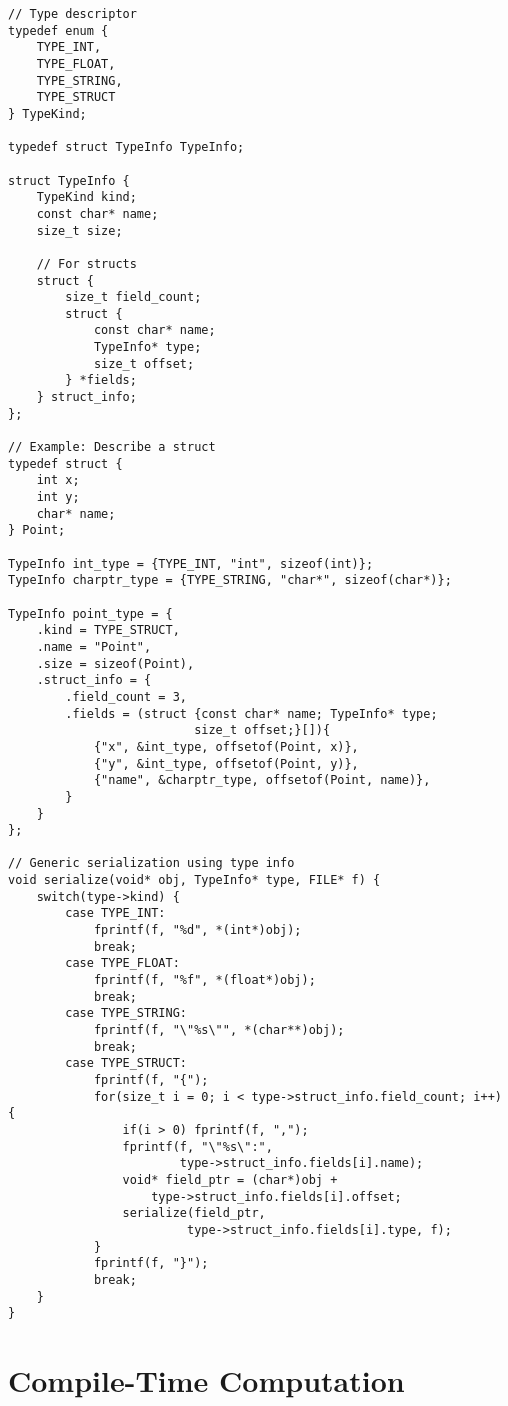 \begin{lstlisting}
// Type descriptor
typedef enum {
    TYPE_INT,
    TYPE_FLOAT,
    TYPE_STRING,
    TYPE_STRUCT
} TypeKind;

typedef struct TypeInfo TypeInfo;

struct TypeInfo {
    TypeKind kind;
    const char* name;
    size_t size;

    // For structs
    struct {
        size_t field_count;
        struct {
            const char* name;
            TypeInfo* type;
            size_t offset;
        } *fields;
    } struct_info;
};

// Example: Describe a struct
typedef struct {
    int x;
    int y;
    char* name;
} Point;

TypeInfo int_type = {TYPE_INT, "int", sizeof(int)};
TypeInfo charptr_type = {TYPE_STRING, "char*", sizeof(char*)};

TypeInfo point_type = {
    .kind = TYPE_STRUCT,
    .name = "Point",
    .size = sizeof(Point),
    .struct_info = {
        .field_count = 3,
        .fields = (struct {const char* name; TypeInfo* type;
                          size_t offset;}[]){
            {"x", &int_type, offsetof(Point, x)},
            {"y", &int_type, offsetof(Point, y)},
            {"name", &charptr_type, offsetof(Point, name)},
        }
    }
};

// Generic serialization using type info
void serialize(void* obj, TypeInfo* type, FILE* f) {
    switch(type->kind) {
        case TYPE_INT:
            fprintf(f, "%d", *(int*)obj);
            break;
        case TYPE_FLOAT:
            fprintf(f, "%f", *(float*)obj);
            break;
        case TYPE_STRING:
            fprintf(f, "\"%s\"", *(char**)obj);
            break;
        case TYPE_STRUCT:
            fprintf(f, "{");
            for(size_t i = 0; i < type->struct_info.field_count; i++) {
                if(i > 0) fprintf(f, ",");
                fprintf(f, "\"%s\":",
                        type->struct_info.fields[i].name);
                void* field_ptr = (char*)obj +
                    type->struct_info.fields[i].offset;
                serialize(field_ptr,
                         type->struct_info.fields[i].type, f);
            }
            fprintf(f, "}");
            break;
    }
}
\end{lstlisting}

\section{Compile-Time Computation}

